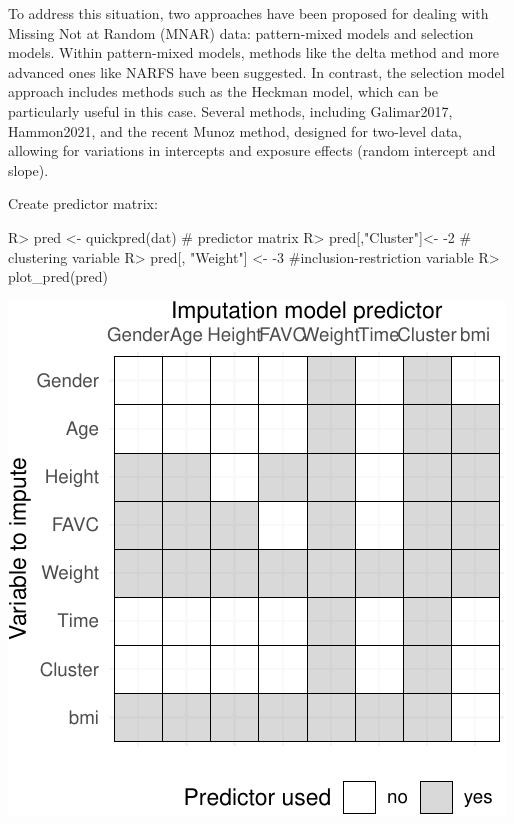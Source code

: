 \documentclass[
]{jss}
\begin{document}
To address this situation, two approaches have been proposed for dealing
with Missing Not at Random (MNAR) data: pattern-mixed models and
selection models. Within pattern-mixed models, methods like the delta
method and more advanced ones like NARFS have been suggested. In
contrast, the selection model approach includes methods such as the
Heckman model, which can be particularly useful in this case. Several
methods, including Galimar2017, Hammon2021, and the recent Munoz method,
designed for two-level data, allowing for variations in intercepts and
exposure effects (random intercept and slope).

Create predictor matrix:

\begin{CodeChunk}
\begin{CodeInput}
R> pred <- quickpred(dat)   # predictor matrix
R> pred[,"Cluster"]<- -2 # clustering variable
R> pred[, "Weight"] <- -3 #inclusion-restriction variable
R> plot_pred(pred)
\end{CodeInput}


\begin{center}\includegraphics{Imputation_of_Incomplete_Multilevel_Data_files/figure-latex/obesity-pred-1} \end{center}

\end{CodeChunk}
\end{document}
